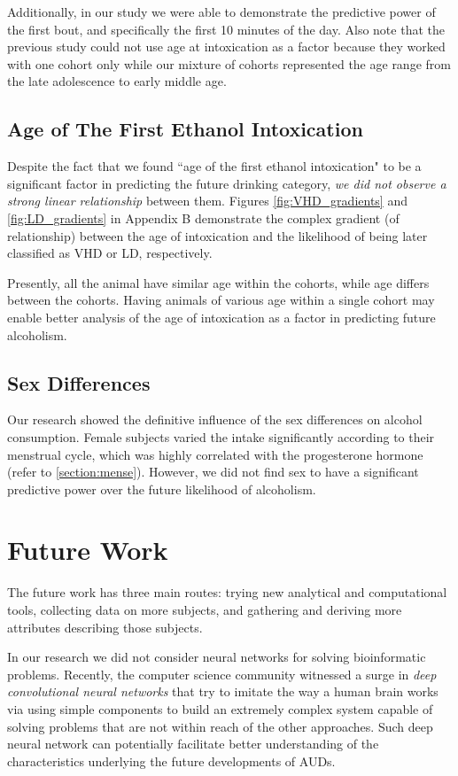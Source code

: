 Additionally, in our study we were able to demonstrate the predictive power of the first bout, and specifically the first 10 minutes of the day. Also note that the previous study could not use age at intoxication as a factor because they worked with one cohort only while our mixture of cohorts represented the age range from the late adolescence to early middle age.


\subsection{Age of The First Ethanol Intoxication}
Despite the fact that we found ``age of the first ethanol intoxication" to be a significant factor in predicting the future drinking category, \textit{we did not observe a strong linear relationship} between them. Figures \ref{fig:VHD_gradients} and \ref{fig:LD_gradients} in Appendix B demonstrate the complex gradient (of relationship) between the age of intoxication and the likelihood of being later classified as VHD or LD, respectively.

Presently, all the animal have similar age within the cohorts, while age differs between the cohorts. Having animals of various age within a single cohort may enable better analysis of the age of intoxication as a factor in predicting future alcoholism.  

\subsection{Sex Differences}
Our research showed the definitive influence of the sex differences on alcohol consumption. Female subjects varied the intake significantly according to their menstrual cycle, which was highly correlated with the progesterone hormone (refer to \ref{section:mense}). However, we did not find sex to have a significant predictive power over the future likelihood of alcoholism.



\section{Future Work}
The future work has three main routes: trying new analytical and computational tools, collecting data on more subjects, and gathering and deriving more attributes describing those subjects. 

In our research we did not consider neural networks for solving bioinformatic problems. Recently, the computer science community witnessed a surge in \textit{deep convolutional neural networks} that try to imitate the way a human brain works via using simple components to build an extremely complex system capable of solving problems that are not within reach of the other approaches. Such deep neural network can potentially facilitate better understanding of the characteristics underlying the future developments of AUDs.  

